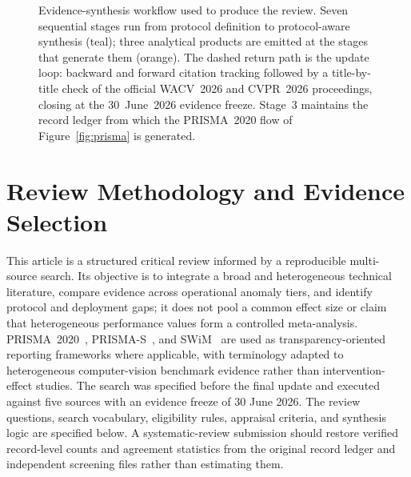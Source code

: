 \documentclass[10pt,a4paper]{article}
\begin{document}
\begin{figure}[!t]
{%
}
\caption{Evidence-synthesis workflow used to produce the review. Seven sequential stages run from protocol definition to protocol-aware synthesis (teal); three analytical products are emitted at the stages that generate them (orange). The dashed return path is the update loop: backward and forward citation tracking followed by a title-by-title check of the official WACV~2026 and CVPR~2026 proceedings, closing at the 30~June~2026 evidence freeze. Stage~3 maintains the record ledger from which the PRISMA~2020 flow of Figure~\ref{fig:prisma} is generated.}
\label{fig:survey_structure}
\end{figure}



\section{Review Methodology and Evidence Selection}
\label{sec:methodology}

This article is a structured critical review informed by a reproducible multi-source search. Its objective is to integrate a broad and heterogeneous technical literature, compare evidence across operational anomaly tiers, and identify protocol and deployment gaps; it does not pool a common effect size or claim that heterogeneous performance values form a controlled meta-analysis. PRISMA~2020~\citep{page2021prisma}, PRISMA-S~\citep{rethlefsen2021prismas}, and SWiM~\citep{campbell2020swim} are used as transparency-oriented reporting frameworks where applicable, with terminology adapted to heterogeneous computer-vision benchmark evidence rather than intervention-effect studies. The search was specified before the final update and executed against five sources with an evidence freeze of 30 June 2026. The review questions, search vocabulary, eligibility rules, appraisal criteria, and synthesis logic are specified below. A systematic-review submission should restore verified record-level counts and agreement statistics from the original record ledger and independent screening files rather than estimating them.
\end{document}
